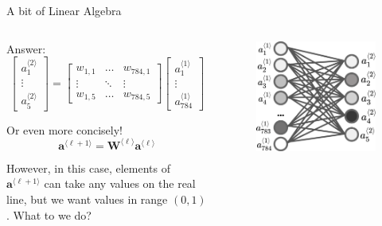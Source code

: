 \documentclass{beamer}
\begin{document}
    \begin{frame}{A bit of Linear Algebra}
        \begin{columns}
        \begin{column}{0.7\textwidth}
        Answer:
        \[
        \begin{bmatrix}
            a_1^{\langle 2 \rangle} \\
            \vdots \\
            a_5^{\langle 2 \rangle}
        \end{bmatrix} = \begin{bmatrix}
            w_{1,1} & \dots & w_{784,1} \\
            \vdots & \ddots & \vdots \\
            w_{1,5} & \dots & w_{784,5}
        \end{bmatrix}\begin{bmatrix}
            a_1^{\langle 1\rangle} \\
            \vdots \\
            a_{784}^{\langle 1\rangle}
        \end{bmatrix}
        \]

        Or even more concisely!
        \[
        \mathbf{a}^{\langle \ell + 1\rangle} = \mathbf{W}^{\langle \ell\rangle}\mathbf{a}^{\langle \ell \rangle}
        \]

        However, in this case, elements of $\mathbf{a}^{\langle \ell + 1\rangle}$ can take any values on the real line, but we want values in range $(0,1)$. What to we do?
        \end{column}

        \begin{column}{0.3\textwidth}
        \begin{figure}
        \centering
            \includegraphics[width=\textwidth]{images/presentation/layer_all_all.png}
        \end{figure}
        \end{column}
        \end{columns}
    \end{frame}
\end{document}
